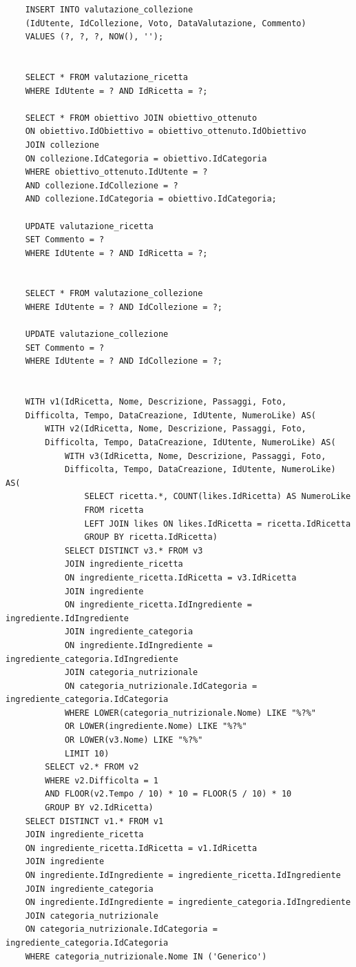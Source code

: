 ﻿\documentclass[a4paper,12pt]{report}
\begin{document}
\begin{verbatim}
    INSERT INTO valutazione_collezione
    (IdUtente, IdCollezione, Voto, DataValutazione, Commento)
    VALUES (?, ?, ?, NOW(), '');
    
    
    SELECT * FROM valutazione_ricetta
    WHERE IdUtente = ? AND IdRicetta = ?;
    
    SELECT * FROM obiettivo JOIN obiettivo_ottenuto
    ON obiettivo.IdObiettivo = obiettivo_ottenuto.IdObiettivo
    JOIN collezione
    ON collezione.IdCategoria = obiettivo.IdCategoria
    WHERE obiettivo_ottenuto.IdUtente = ?
    AND collezione.IdCollezione = ?
    AND collezione.IdCategoria = obiettivo.IdCategoria;
    
    UPDATE valutazione_ricetta
    SET Commento = ?
    WHERE IdUtente = ? AND IdRicetta = ?;
    
    
    SELECT * FROM valutazione_collezione
    WHERE IdUtente = ? AND IdCollezione = ?;
    
    UPDATE valutazione_collezione
    SET Commento = ?
    WHERE IdUtente = ? AND IdCollezione = ?;
    
    
    WITH v1(IdRicetta, Nome, Descrizione, Passaggi, Foto,
    Difficolta, Tempo, DataCreazione, IdUtente, NumeroLike) AS(
        WITH v2(IdRicetta, Nome, Descrizione, Passaggi, Foto, 
        Difficolta, Tempo, DataCreazione, IdUtente, NumeroLike) AS(
            WITH v3(IdRicetta, Nome, Descrizione, Passaggi, Foto, 
            Difficolta, Tempo, DataCreazione, IdUtente, NumeroLike) AS(
                SELECT ricetta.*, COUNT(likes.IdRicetta) AS NumeroLike
                FROM ricetta
                LEFT JOIN likes ON likes.IdRicetta = ricetta.IdRicetta
                GROUP BY ricetta.IdRicetta)
            SELECT DISTINCT v3.* FROM v3
            JOIN ingrediente_ricetta
            ON ingrediente_ricetta.IdRicetta = v3.IdRicetta
            JOIN ingrediente
            ON ingrediente_ricetta.IdIngrediente = ingrediente.IdIngrediente
            JOIN ingrediente_categoria
            ON ingrediente.IdIngrediente = ingrediente_categoria.IdIngrediente
            JOIN categoria_nutrizionale 
            ON categoria_nutrizionale.IdCategoria = ingrediente_categoria.IdCategoria
            WHERE LOWER(categoria_nutrizionale.Nome) LIKE "%?%"
            OR LOWER(ingrediente.Nome) LIKE "%?%"
            OR LOWER(v3.Nome) LIKE "%?%"
            LIMIT 10)
        SELECT v2.* FROM v2
        WHERE v2.Difficolta = 1
        AND FLOOR(v2.Tempo / 10) * 10 = FLOOR(5 / 10) * 10 
        GROUP BY v2.IdRicetta)
    SELECT DISTINCT v1.* FROM v1
    JOIN ingrediente_ricetta
    ON ingrediente_ricetta.IdRicetta = v1.IdRicetta
    JOIN ingrediente
    ON ingrediente.IdIngrediente = ingrediente_ricetta.IdIngrediente
    JOIN ingrediente_categoria
    ON ingrediente.IdIngrediente = ingrediente_categoria.IdIngrediente
    JOIN categoria_nutrizionale
    ON categoria_nutrizionale.IdCategoria = ingrediente_categoria.IdCategoria
    WHERE categoria_nutrizionale.Nome IN ('Generico')
    

\end{verbatim}
\end{document}
